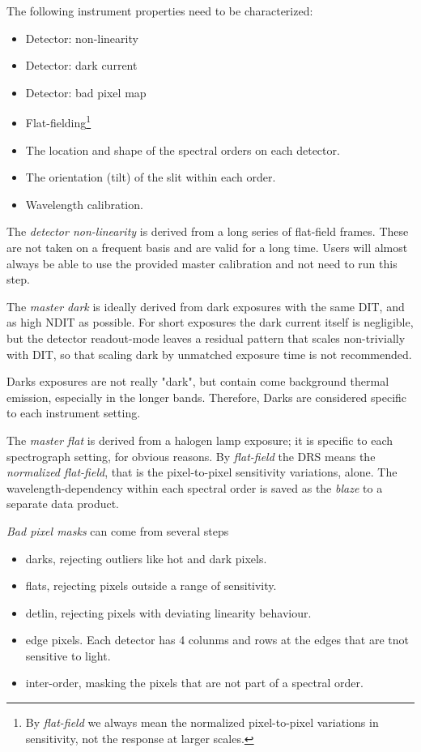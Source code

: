 The following instrument properties need to be characterized:
\begin{itemize}
    \item Detector: non-linearity
    \item Detector: dark current
    \item Detector: bad pixel map
    \item Flat-fielding\footnote{By \textit{flat-field} we always mean the
              normalized pixel-to-pixel variations
              in sensitivity, not the response at larger scales.}
    \item The location and shape of the spectral orders on each detector.
    \item The orientation (tilt) of the slit within each order.
    \item Wavelength calibration.
\end{itemize}

The \emph{detector non-linearity} is derived from a long series of flat-field
frames. These are not taken on a frequent basis and are valid for a long time.
Users will almost always be able to use the provided master calibration and not
need to run this step.

The \emph{master dark} is ideally derived from dark exposures with the
same DIT, and as high NDIT as possible. For short exposures the dark current
itself is negligible, but the detector readout-mode leaves a residual pattern
that scales non-trivially with DIT, so that scaling dark by unmatched exposure
time is not recommended.

Darks exposures are not really "dark", but contain come background thermal emission,
especially in the longer bands. Therefore, Darks are considered specific to
each instrument setting.

The \emph{master flat} is derived from a halogen lamp exposure; it is specific
to each spectrograph setting, for obvious reasons. By \emph{flat-field} the DRS
means the \emph{normalized flat-field}, that is the pixel-to-pixel sensitivity
variations, alone. The wavelength-dependency within each spectral order is
saved as the \emph{blaze} to a separate data product.

\emph{Bad pixel masks} can come from several steps
\begin{itemize}
    \item darks, rejecting outliers like hot and dark pixels.
    \item flats, rejecting pixels outside a range of sensitivity.
    \item detlin, rejecting pixels with deviating linearity behaviour.
    \item edge pixels. Each detector has 4 colunms and rows at the edges that
        are tnot sensitive to light.
    \item inter-order, masking the pixels that are not part of a spectral order.
\end{itemize}

